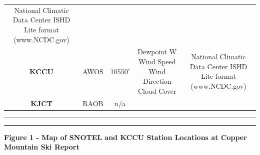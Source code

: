 \documentclass[11pt]{article}
\begin{document}
\begin{longtable}[]{@{}ccccc@{}}
\begin{minipage}[t]{0.18\columnwidth}
National Climatic Data Center ISHD Lite format (www.NCDC.gov)\strut
\end{minipage}\tabularnewline
\begin{minipage}[t]{0.18\columnwidth}\centering\strut
\textbf{KCCU}\strut
\end{minipage} & \begin{minipage}[t]{0.18\columnwidth}\centering\strut
AWOS\strut
\end{minipage} & \begin{minipage}[t]{0.17\columnwidth}\centering\strut
10550'\strut
\end{minipage} & \begin{minipage}[t]{0.15\columnwidth}\centering\strut
Dewpoint W Wind Speed Wind Direction Cloud Cover\strut
\end{minipage} & \begin{minipage}[t]{0.18\columnwidth}\centering\strut
National Climatic Data Center ISHD Lite format (www.NCDC.gov)\strut
\end{minipage}\tabularnewline
\begin{minipage}[t]{0.18\columnwidth}\centering\strut
\textbf{KJCT}\strut
\end{minipage} & \begin{minipage}[t]{0.18\columnwidth}\centering\strut
RAOB\strut
\end{minipage} & \begin{minipage}[t]{0.17\columnwidth}\centering\strut
n/a\strut
\end{minipage} & \begin{minipage}[t]{0.15\columnwidth}\centering\strut
\strut
\end{minipage}\tabularnewline
\bottomrule
\end{longtable}

\begin{center}\rule{0.5\linewidth}{\linethickness}\end{center}

\begin{center}\rule{0.5\linewidth}{\linethickness}\end{center}

\textbf{Figure 1 - Map of SNOTEL and KCCU Station Locations at Copper
Mountain Ski Report}
\end{document}
